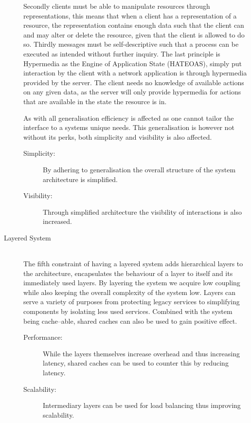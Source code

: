 \begin{description}
    Secondly clients must be able to manipulate resources through representations, this means that when a client has a representation of a resource, the representation contains enough data such that the client can and may alter or delete the resource, given that the client is allowed to do so.
    Thirdly messages must be self-descriptive such that a process can be executed as intended without further inquiry.
    The last principle is Hypermedia as the Engine of Application State (HATEOAS), simply put interaction by the client with a network application is through hypermedia provided by the server.
    The client needs no knowledge of available actions on any given data, as the server will only provide hypermedia for actions that are available in the state the resource is in.

    As with all generalisation efficiency is affected as one cannot tailor the interface to a systems unique needs.
    This generalisation is however not without its perks, both simplicity and visibility is also affected.
    \begin{description}
        \item[Simplicity:] By adhering to generalisation the overall structure of the system architecture is simplified.
        \item[Visibility:] Through simplified architecture the visibility of interactions is also increased.
    \end{description}
    \item [Layered System\label{layeredsystem}] \hfill \\
    The fifth constraint of having a layered system adds hierarchical layers to the architecture, encapsulates the behaviour of a layer to itself and its immediately used layers.
    By layering the system we acquire low coupling while also keeping the overall complexity of the system low.
    Layers can serve a variety of purposes from protecting legacy services to simplifying components by isolating less used services.
    Combined with the system being cache--able, shared caches can also be used to gain positive effect.
    \begin{description}
        \item[Performance:] While the layers themselves increase overhead and thus increasing latency, shared caches can be used to counter this by reducing latency.
        \item[Scalability:] Intermediary layers can be used for load balancing thus improving scalability.

\end{description}
\end{description}
